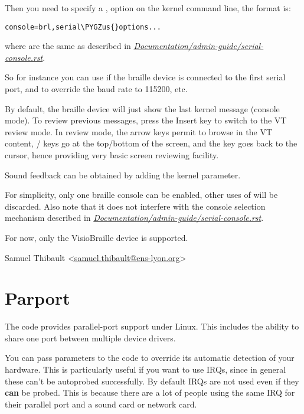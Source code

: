 \documentclass[a4paper,8pt,english]{sphinxmanual}
\def\PYGZus{\char`\_}
\begin{document}
Then you need to specify a , option on the kernel command line, the
format is:

\begin{Verbatim}[commandchars=\\\{\}]
console=brl,serial\PYGZus{}options...
\end{Verbatim}

where  are the same as described in
{\hyperref[admin\string-guide/serial\string-console:serial\string-console]{\emph{Documentation/admin-guide/serial-console.rst}}}.

So for instance you can use  if the braille device is connected to the first serial port, and  to
override the baud rate to 115200, etc.

By default, the braille device will just show the last kernel message (console
mode).  To review previous messages, press the Insert key to switch to the VT
review mode.  In review mode, the arrow keys permit to browse in the VT content,
/ keys go at the top/bottom of the screen, and
the  key goes back
to the cursor, hence providing very basic screen reviewing facility.

Sound feedback can be obtained by adding the  kernel
parameter.

For simplicity, only one braille console can be enabled, other uses of
 will be discarded.  Also note that it does not interfere with
the console selection mechanism described in
{\hyperref[admin\string-guide/serial\string-console:serial\string-console]{\emph{Documentation/admin-guide/serial-console.rst}}}.

For now, only the VisioBraille device is supported.

Samuel Thibault \textless{}\href{mailto:samuel.thibault@ens-lyon.org}{samuel.thibault@ens-lyon.org}\textgreater{}


\chapter{Parport}
\label{admin-guide/parport:parport}\label{admin-guide/parport::doc}
The  code provides parallel-port support under Linux.  This
includes the ability to share one port between multiple device
drivers.

You can pass parameters to the  code to override its automatic
detection of your hardware.  This is particularly useful if you want
to use IRQs, since in general these can't be autoprobed successfully.
By default IRQs are not used even if they \textbf{can} be probed.  This is
because there are a lot of people using the same IRQ for their
parallel port and a sound card or network card.
\end{document}
